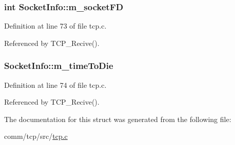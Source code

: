 \subsubsection[{\texorpdfstring{m\+\_\+socket\+FD}{m_socketFD}}]{\setlength{\rightskip}{0pt plus 5cm}int Socket\+Info\+::m\+\_\+socket\+FD}\hypertarget{structSocketInfo_a2235bbbc0f81915ee129742348a85d97}{}\label{structSocketInfo_a2235bbbc0f81915ee129742348a85d97}


Definition at line 73 of file tcp.\+c.



Referenced by T\+C\+P\+\_\+\+Recive().

\subsubsection[{\texorpdfstring{m\+\_\+time\+To\+Die}{m_timeToDie}}]{ Socket\+Info\+::m\+\_\+time\+To\+Die}\hypertarget{structSocketInfo_a668a08c14a012d8609a7867d68ebcc80}{}\label{structSocketInfo_a668a08c14a012d8609a7867d68ebcc80}


Definition at line 74 of file tcp.\+c.



Referenced by T\+C\+P\+\_\+\+Recive().



The documentation for this struct was generated from the following file\+:\begin{DoxyCompactItemize}
\item 
comm/tcp/src/\hyperlink{tcp_8c}{tcp.\+c}\end{DoxyCompactItemize}
